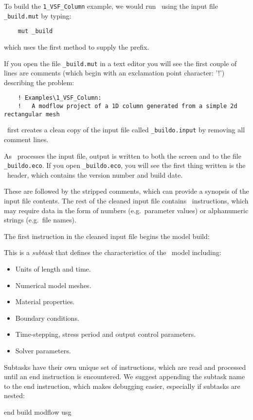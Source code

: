 To build the \texttt{1\_VSF\_Column} example, we would  run \mut\ using the input file \texttt{\_build.mut} by typing:
\begin{verbatim}
    mut _build
\end{verbatim}
which uses the first method to supply the prefix.


If you open the file \texttt{\_build.mut} in a text editor you will see the first couple of lines are comments (which begin with an exclamation point character: '!') describing the problem:
\squish
\begin{verbatim}
    ! Examples\1_VSF_Column:
    !   A modflow project of a 1D column generated from a simple 2d rectangular mesh
\end{verbatim}
 \mut\ first creates a clean copy of the input file called \texttt{\_buildo.input} by removing all comment lines.

 As \mut\ processes the input file, output is written to both the screen and to the file \texttt{\_buildo.eco}.  If you open \texttt{\_buildo.eco}, you will see the first thing written is the \mut\ header, which contains the version number and build date.

 These are followed by the stripped comments, which  can provide a synopsis of the input file contents. The rest of the cleaned input file contains \mut\ instructions, which may require data in the form of numbers (e.g.\ parameter values) or alphanumeric strings (e.g.\ file names).


The first instruction in the cleaned input file begins the model build:

    {This  is a {\em subtask} that defines the characteristics of the \mfus\ model including:
     \begin{itemize}
        \item Units of length and time.
        \item Numerical model meshes.
        \item Material properties.
        \item Boundary conditions.
        \item Time-stepping, stress period and output control parameters.
        \item Solver parameters.
    \end{itemize}
    Subtasks have their own unique set of instructions, which are read and processed until an \textsf{end} instruction is encountered.  We suggest appending the subtask name to the \textsf{end} instruction, which makes debugging easier, especially if subtasks are nested:

    {\Large \sf end build modflow usg}
    }

